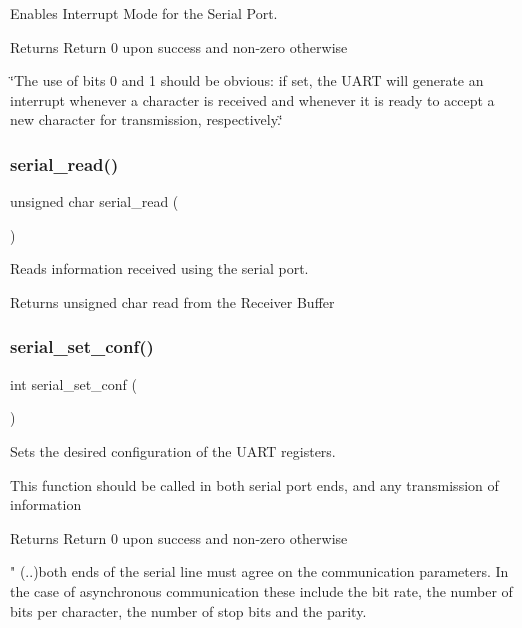 Enables Interrupt Mode for the Serial Port. 

\begin{DoxyReturn}{Returns}
Return 0 upon success and non-\/zero otherwise
\end{DoxyReturn}
\char`\"{}\+The use of bits 0 and 1 should be obvious\+: if set, the U\+A\+R\+T will generate an interrupt whenever
a character is received and whenever it is ready to accept a new character for transmission, respectively.\char`\"{} \hypertarget{group___serial_ga733df3cf88f5c81a1c4ae2822342dd2d}{}\label{group___serial_ga733df3cf88f5c81a1c4ae2822342dd2d} 
\subsubsection{\texorpdfstring{serial\+\_\+read()}{serial\_read()}}
{\footnotesize\ttfamily unsigned char serial\+\_\+read (\begin{DoxyParamCaption}{ }\end{DoxyParamCaption})}



Reads information received using the serial port. 

\begin{DoxyReturn}{Returns}
unsigned char read from the Receiver Buffer 
\end{DoxyReturn}
\hypertarget{group___serial_ga78786e639e5d536f1c65170e7396fde6}{}\label{group___serial_ga78786e639e5d536f1c65170e7396fde6} 
\subsubsection{\texorpdfstring{serial\+\_\+set\+\_\+conf()}{serial\_set\_conf()}}
{\footnotesize\ttfamily int serial\+\_\+set\+\_\+conf (\begin{DoxyParamCaption}{ }\end{DoxyParamCaption})}



Sets the desired configuration of the U\+A\+RT registers. 

This function should be called in both serial port ends, and any transmission of information

\begin{DoxyReturn}{Returns}
Return 0 upon success and non-\/zero otherwise
\end{DoxyReturn}
" (..)both ends of the serial line must agree on the communication parameters. In the case of asynchronous communication these include the bit rate, the number of bits per character, the number of stop bits and the parity. \hypertarget{group___serial_ga31328528e82730ef05d9e6121447dd42}{}\label{group___serial_ga31328528e82730ef05d9e6121447dd42} 
